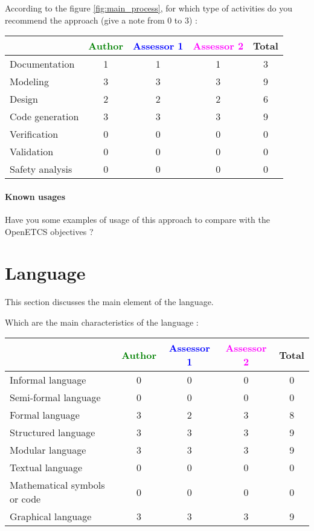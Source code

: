 According to the figure \ref{fig:main_process}, for which type of activities do you recommend the approach (give a note from 0 to  3) :

\begin{tabular}{|l | c | c | c | c|}
\hline
& \textcolor{green}{Author} & \textcolor{blue}{Assessor 1} & \textcolor{magenta}{Assessor 2} & Total \\
\hline 
Documentation &1 &1 & 1 & 3 \\
\hline
Modeling &3 &3 & 3&  9 \\
\hline
Design &2 &2 & 2 & 6 \\
\hline
Code generation &3 &3 & 3& 9 \\
\hline
Verification &0 &0 & 0& 0 \\
\hline
Validation &0 &0 & 0& 0 \\
\hline
Safety analysis &0 &0 & 0& 0 \\
\hline
\end{tabular}

\paragraph{Known usages} Have you some examples of usage of this approach to  compare with the OpenETCS objectives ?

\section{Language}
This section discusses the main element of the language.

Which are the main characteristics of the language :

\begin{tabular}{|l | c | c | c | c|}
  \hline
  & \textcolor{green}{Author} & \textcolor{blue}{Assessor 1} & \textcolor{magenta}{Assessor 2} & Total \\
  \hline 
  Informal language &0 &0 & 0& 0  \\
  \hline 
  Semi-formal language &0 &0 & 0&  0 \\
  \hline
  Formal language &3 &2 & 3& 8 \\
  \hline
  Structured language &3 &3 & 3& 9 \\
  \hline
  Modular language &3 &3 & 3& 9 \\
  \hline
  Textual language &0 &0 & 0& 0 \\
  \hline
  Mathematical symbols or code &0 &0 & 0& 0 \\
  \hline
  Graphical language &3 &3 & 3& 9 \\
  \hline
\end{tabular}


